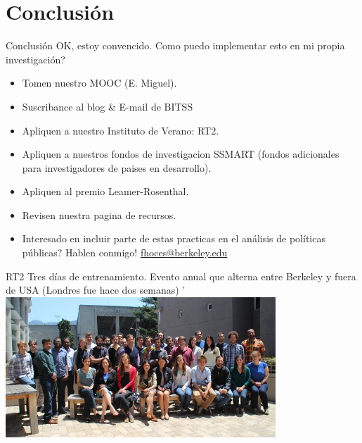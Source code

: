 \documentclass{beamer}
\begin{document}
\section{Conclusión}
\begin{frame}{Conclusión}
OK, estoy convencido. Como puedo implementar esto en mi propia investigación?

\begin{itemize}[<.->]
\item Tomen nuestro MOOC (E. Miguel).\href{https://www.futurelearn.com/courses/open-social-science-research}{}
\item Suscribance al blog \& E-mail de BITSS \href{https://bitss.org/blog}{}
\item Apliquen a nuestro Instituto de Verano: RT2. \href{http://www.bitss.org/events/summer-institute/}{}
\item Apliquen a nuestros fondos de investigacion SSMART (fondos adicionales para investigadores de paises en desarrollo). \href{http://www.bitss.org/ssmart-grants/}{}
\item Apliquen al premio Leamer-Rosenthal. \href{http://www.bitss.org/lr-prizes/}{}
\item Revisen nuestra pagina de recursos. \href{http://www.bitss.org/resource-tag/education/}{}
\item Interesado en incluir parte de estas practicas en el análisis de políticas públicas? Hablen conmigo! \href{mailto:fhoces@berkeley.edu}{fhoces@berkeley.edu}

\end{itemize}
\end{frame}

\begin{frame}{RT2}
Tres días de entrenamiento. Evento anual que alterna entre Berkeley y fuera de USA (Londres fue hace dos semanas)
'\includegraphics[width=4in]{../Images/bitss-2014-cohort2.jpg}
\end{frame}
\end{document}
